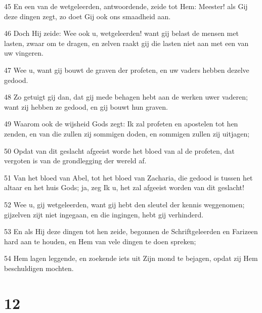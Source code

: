\par 45 En een van de wetgeleerden, antwoordende, zeide tot Hem: Meester! als Gij deze dingen zegt, zo doet Gij ook ons smaadheid aan.
\par 46 Doch Hij zeide: Wee ook u, wetgeleerden! want gij belast de mensen met lasten, zwaar om te dragen, en zelven raakt gij die lasten niet aan met een van uw vingeren.
\par 47 Wee u, want gij bouwt de graven der profeten, en uw vaders hebben dezelve gedood.
\par 48 Zo getuigt gij dan, dat gij mede behagen hebt aan de werken uwer vaderen; want zij hebben ze gedood, en gij bouwt hun graven.
\par 49 Waarom ook de wijsheid Gods zegt: Ik zal profeten en apostelen tot hen zenden, en van die zullen zij sommigen doden, en sommigen zullen zij uitjagen;
\par 50 Opdat van dit geslacht afgeeist worde het bloed van al de profeten, dat vergoten is van de grondlegging der wereld af.
\par 51 Van het bloed van Abel, tot het bloed van Zacharia, die gedood is tussen het altaar en het huis Gods; ja, zeg Ik u, het zal afgeeist worden van dit geslacht!
\par 52 Wee u, gij wetgeleerden, want gij hebt den sleutel der kennis weggenomen; gijzelven zijt niet ingegaan, en die ingingen, hebt gij verhinderd.
\par 53 En als Hij deze dingen tot hen zeide, begonnen de Schriftgeleerden en Farizeen hard aan te houden, en Hem van vele dingen te doen spreken;
\par 54 Hem lagen leggende, en zoekende iets uit Zijn mond te bejagen, opdat zij Hem beschuldigen mochten.

\chapter{12}

